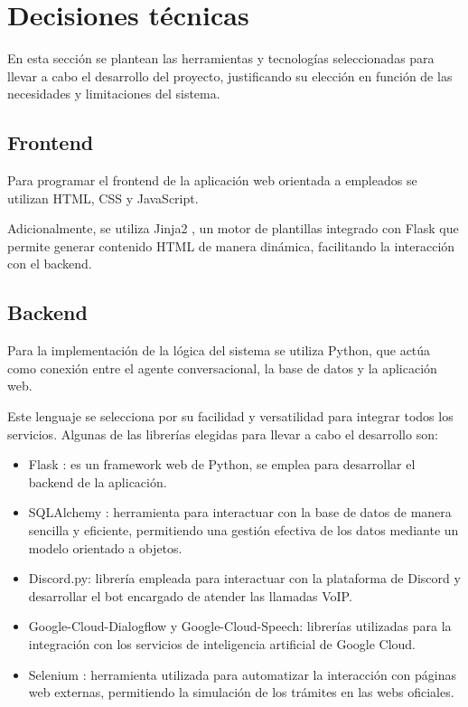 \section{Decisiones técnicas}
    En esta sección se plantean las herramientas y tecnologías seleccionadas para llevar a cabo el desarrollo del proyecto, justificando su elección en función de las necesidades y limitaciones del sistema. 
    
    \subsection{Frontend} 
        Para programar el frontend de la aplicación web orientada a empleados se utilizan HTML, CSS y JavaScript. 
        
        Adicionalmente, se utiliza Jinja2 \cite{ref6}, un motor de plantillas integrado con Flask que permite generar contenido HTML de manera dinámica, facilitando la interacción con el backend. 
    
    \subsection{Backend}
        Para la implementación de la lógica del sistema se utiliza Python, que actúa como conexión entre el agente conversacional, la base de datos y la aplicación web. 
            
        Este lenguaje se selecciona por su facilidad y versatilidad para integrar todos los servicios.
        Algunas de las librerías elegidas para llevar a cabo el desarrollo son:
        \begin{itemize}
            \item Flask \cite{ref7}: es un framework web de Python, se emplea para desarrollar el backend de la aplicación.
            \item SQLAlchemy \cite{ref8}: herramienta para interactuar con la base de datos de manera sencilla y eficiente, permitiendo una gestión efectiva de los datos mediante un modelo orientado a objetos.
            \item Discord.py: librería empleada para interactuar con la plataforma de Discord y desarrollar el bot encargado de atender las llamadas VoIP.
            \item Google-Cloud-Dialogflow y Google-Cloud-Speech: librerías utilizadas para la integración con los servicios de inteligencia artificial de Google Cloud.
            \item Selenium \cite{ref9}: herramienta utilizada para automatizar la interacción con páginas web externas, permitiendo la simulación de los trámites en las webs oficiales.
        \end{itemize}

